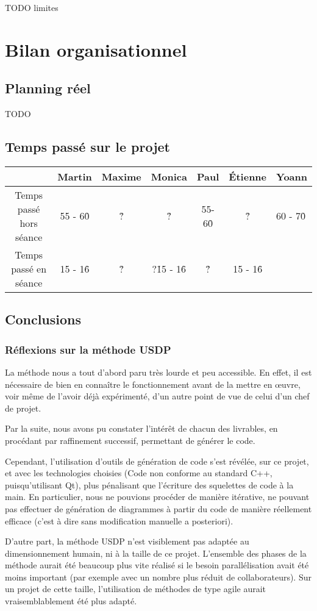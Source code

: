 {\huge TODO limites}

\section{Bilan organisationnel}
\subsection{Planning réel}
{\Huge TODO}
\subsection{Temps passé sur le projet} 
\begin{tabular}{|c|c|c|c|c|c|}
\hline
& Martin & Maxime & Monica & Paul & Étienne & Yoann \\
\hline
Temps passé hors séance & 55 - 60\h & ?\h & ?\h & 55-60\h & ?\h & 60 - 70\h \\
Temps passé en séance & 15 - 16\h & ?\h & ?\h 15 - 16\h & ?\h & 15 - 16\h \\
\hline
\end{tabular}

\subsection{Conclusions}
\subsubsection{Réflexions sur la méthode USDP}
La méthode nous a tout d'abord paru très lourde et peu accessible. En effet, il est nécessaire de bien en connaître le fonctionnement avant de la mettre en \oe uvre, voir même de l'avoir déjà expérimenté, d'un autre point de vue de celui d'un chef de projet.

Par la suite, nous avons pu constater l'intérêt de chacun des livrables, en procédant par raffinement successif, permettant de générer le code.

Cependant, l'utilisation d'outils de génération de code s'est révélée, sur ce projet, et avec les technologies choisies (Code non conforme au standard C++, puisqu'utilisant Qt), plus pénalisant que l'écriture des squelettes de code à la main. En particulier, nous ne pouvions procéder de manière itérative, ne pouvant pas effectuer de génération de diagrammes à partir du code de manière réellement efficace (c'est à dire sans modification manuelle a posteriori).

D'autre part, la méthode USDP n'est visiblement pas adaptée au dimensionnement humain, ni à la taille de ce projet. L'ensemble des phases de la méthode aurait été beaucoup plus vite réalisé si le besoin parallélisation avait été moins important (par exemple avec un nombre plus réduit de collaborateurs). Sur un projet de cette taille, l'utilisation de méthodes de type agile aurait vraisemblablement été plus adapté.

